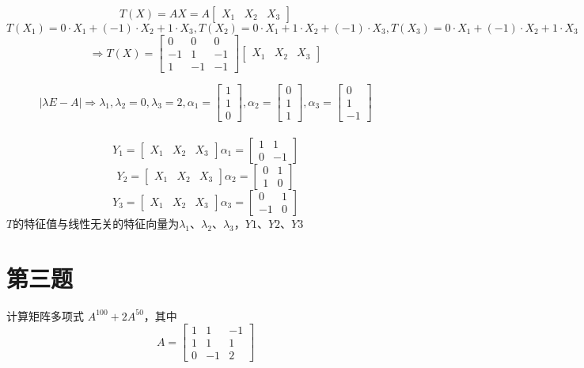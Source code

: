\documentclass{article}
\begin{document}
\[
T(X)=AX = A\begin{bmatrix}X_1 & X_2 & X_3\end{bmatrix}\]
\[T(X_1) = 0 · X_1 + (-1) · X_2 + 1 · X_3,
T(X_2) = 0 · X_1 + 1 · X_2 + (-1) · X_3,
T(X_3) = 0 · X_1 + (-1) · X_2 + 1 · X_3 \]
\[\Rightarrow T(X) = \begin{bmatrix}0 & 0 & 0 \\ -1 & 1 & -1 \\ 1 & -1 & -1\end{bmatrix}
\begin{bmatrix}X_1 & X_2 & X_3\end{bmatrix}\]

\[\mid \lambda E - A \mid \Rightarrow \lambda_1,\lambda_2 = 0, \lambda_3 = 2,
\alpha_1 = \begin{bmatrix}1 \\ 1 \\ 0\end{bmatrix},
\alpha_2 = \begin{bmatrix}0 \\ 1 \\ 1\end{bmatrix},
\alpha_3 = \begin{bmatrix}0 \\ 1 \\ -1\end{bmatrix}\] \\
\[Y_1 = \begin{bmatrix}X_1 & X_2 & X_3\end{bmatrix}\alpha_1 = \begin{bmatrix}1 & 1 \\ 0 & -1\end{bmatrix}\]
\[Y_2 = \begin{bmatrix}X_1 & X_2 & X_3\end{bmatrix}\alpha_2 = \begin{bmatrix}0 & 1 \\ 1 & 0\end{bmatrix}\]
\[Y_3 = \begin{bmatrix}X_1 & X_2 & X_3\end{bmatrix}\alpha_3 = \begin{bmatrix}0 & 1 \\ -1 & 0\end{bmatrix}\]
$T$的特征值与线性无关的特征向量为$\lambda_1$、$\lambda_2$、$\lambda_3$，$Y1$、$Y2$、$Y3$

\newpage
\section{第三题}\noindent
计算矩阵多项式 $A^{100}+2A^{50}$，其中
\[
A = \begin{bmatrix}
1 & 1 & -1 \\
1 & 1 & 1 \\
0 & -1 & 2
\end{bmatrix}
\]
\end{document}
